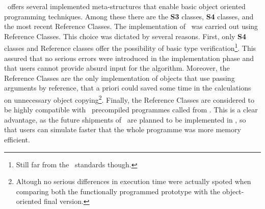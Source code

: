 \RR\, offers several implemented meta-structures that enable basic object oriented programming techniques. Among these there are the \textbf{S3} classes, \textbf{S4} classes, and the most recent Reference Classes. The implementation of \Metro\, was carried out using Reference Classes. This choice was dictated by several reasons. First, only \textbf{S4} classes and Reference classes offer the possibility of basic type verification\footnote{Still far from the \Cpp\, standards though.}. This assured that no serious errors were introduced in the implementation phase and that users cannot provide absurd input for the algorithm. Moreover, the Reference Classes are the only implementation of objects that use passing arguments by reference, that a priori could saved some time in the calculations on unnecessary object copying\footnote{Altough no serious differences in execution time were actually spoted when comparing both the functionally programmed prototype with the object-oriented final version.}. Finally, the Reference Classes are considered to be highly compatible with \Cpp\, precompiled programmes called from \RR. This is a clear advantage, as the future shipments of \Metro\, are planned to be implemented in \Cpp, so that users can simulate faster that the whole programme was more memory efficient.   